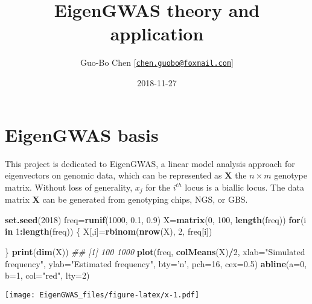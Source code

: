 \documentclass[]{book}
\title{EigenGWAS theory and application}
\author{Guo-Bo Chen
{[}\href{mailto:chen.guobo@foxmail.com}{\nolinkurl{chen.guobo@foxmail.com}}{]}}
\date{2018-11-27}
\newenvironment{Shaded}{\begin{snugshade}}{\end{snugshade}}
\newcommand{\CommentTok}[1]{\textcolor[rgb]{0.56,0.35,0.01}{\textit{#1}}}
\newcommand{\ControlFlowTok}[1]{\textcolor[rgb]{0.13,0.29,0.53}{\textbf{#1}}}
\newcommand{\DataTypeTok}[1]{\textcolor[rgb]{0.13,0.29,0.53}{#1}}
\newcommand{\DecValTok}[1]{\textcolor[rgb]{0.00,0.00,0.81}{#1}}
\newcommand{\FloatTok}[1]{\textcolor[rgb]{0.00,0.00,0.81}{#1}}
\newcommand{\KeywordTok}[1]{\textcolor[rgb]{0.13,0.29,0.53}{\textbf{#1}}}
\newcommand{\NormalTok}[1]{#1}
\newcommand{\OperatorTok}[1]{\textcolor[rgb]{0.81,0.36,0.00}{\textbf{#1}}}
\newcommand{\StringTok}[1]{\textcolor[rgb]{0.31,0.60,0.02}{#1}}
\begin{document}
\maketitle

{
\setcounter{tocdepth}{1}
\tableofcontents
}
\hypertarget{eigengwas-basis}{%
\chapter{EigenGWAS basis}\label{eigengwas-basis}}

This project is dedicated to EigenGWAS, a linear model analysis approach
for eigenvectors on genomic data, which can be represented as
\(\mathbf{X}\) the \(n \times m\) genotype matrix. Without loss of
generality, \(x_j\) for the \(i^{th}\) locus is a biallic locus. The
data matrix \(\mathbf{X}\) can be generated from genotyping chips, NGS,
or GBS.

\begin{Shaded}
\begin{Highlighting}[]
\KeywordTok{set.seed}\NormalTok{(}\DecValTok{2018}\NormalTok{)}
\NormalTok{freq=}\KeywordTok{runif}\NormalTok{(}\DecValTok{1000}\NormalTok{, }\FloatTok{0.1}\NormalTok{, }\FloatTok{0.9}\NormalTok{)}
\NormalTok{X=}\KeywordTok{matrix}\NormalTok{(}\DecValTok{0}\NormalTok{, }\DecValTok{100}\NormalTok{, }\KeywordTok{length}\NormalTok{(freq))}
\ControlFlowTok{for}\NormalTok{(i }\ControlFlowTok{in} \DecValTok{1}\OperatorTok{:}\KeywordTok{length}\NormalTok{(freq)) \{}
\NormalTok{  X[,i]=}\KeywordTok{rbinom}\NormalTok{(}\KeywordTok{nrow}\NormalTok{(X), }\DecValTok{2}\NormalTok{, freq[i])}

\NormalTok{\}}
\KeywordTok{print}\NormalTok{(}\KeywordTok{dim}\NormalTok{(X))}
\CommentTok{## [1]  100 1000}
\KeywordTok{plot}\NormalTok{(freq, }\KeywordTok{colMeans}\NormalTok{(X)}\OperatorTok{/}\DecValTok{2}\NormalTok{, }\DataTypeTok{xlab=}\StringTok{"Simulated frequency"}\NormalTok{, }\DataTypeTok{ylab=}\StringTok{"Estimated frequency"}\NormalTok{, }\DataTypeTok{bty=}\StringTok{'n'}\NormalTok{, }\DataTypeTok{pch=}\DecValTok{16}\NormalTok{, }\DataTypeTok{cex=}\FloatTok{0.5}\NormalTok{)}
\KeywordTok{abline}\NormalTok{(}\DataTypeTok{a=}\DecValTok{0}\NormalTok{, }\DataTypeTok{b=}\DecValTok{1}\NormalTok{, }\DataTypeTok{col=}\StringTok{"red"}\NormalTok{, }\DataTypeTok{lty=}\DecValTok{2}\NormalTok{)}
\end{Highlighting}
\end{Shaded}

\texttt{[image: EigenGWAS\_files/figure-latex/x-1.pdf]}
\end{document}
